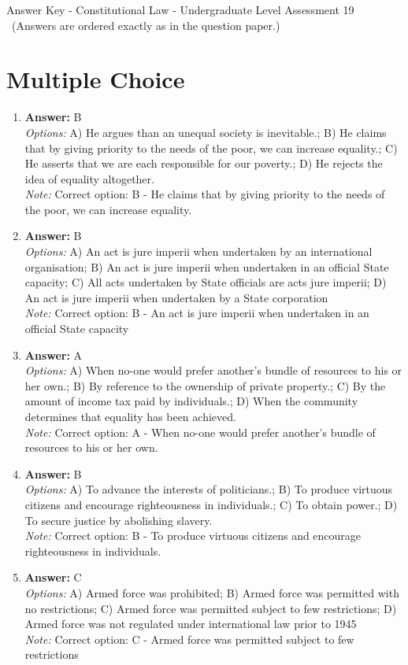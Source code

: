 \documentclass[12pt]{article}
\begin{document}
\begin{center}
Answer Key - Constitutional Law - Undergraduate Level Assessment 19 \
\small (Answers are ordered exactly as in the question paper.)
\end{center}

\section*{Multiple Choice}
\begin{enumerate}[label=\arabic*.]
\item \textbf{Answer:} B
\\ \textit{Options:} A) He argues than an unequal society is inevitable.; B) He claims that by giving priority to the needs of the poor, we can increase equality.; C) He asserts that we are each responsible for our poverty.; D) He rejects the idea of equality altogether.
\\ \textit{Note:} Correct option: B - He claims that by giving priority to the needs of the poor, we can increase equality.
\item \textbf{Answer:} B
\\ \textit{Options:} A) An act is jure imperii when undertaken by an international organisation; B) An act is jure imperii when undertaken in an official State capacity; C) All acts undertaken by State officials are acts jure imperii; D) An act is jure imperii when undertaken by a State corporation
\\ \textit{Note:} Correct option: B - An act is jure imperii when undertaken in an official State capacity
\item \textbf{Answer:} A
\\ \textit{Options:} A) When no-one would prefer another's bundle of resources to his or her own.; B) By reference to the ownership of private property.; C) By the amount of income tax paid by individuals.; D) When the community determines that equality has been achieved.
\\ \textit{Note:} Correct option: A - When no-one would prefer another's bundle of resources to his or her own.
\item \textbf{Answer:} B
\\ \textit{Options:} A) To advance the interests of politicians.; B) To produce virtuous citizens and encourage righteousness in individuals.; C) To obtain power.; D) To secure justice by abolishing slavery.
\\ \textit{Note:} Correct option: B - To produce virtuous citizens and encourage righteousness in individuals.
\item \textbf{Answer:} C
\\ \textit{Options:} A) Armed force was prohibited; B) Armed force was permitted with no restrictions; C) Armed force was permitted subject to few restrictions; D) Armed force was not regulated under international law prior to 1945
\\ \textit{Note:} Correct option: C - Armed force was permitted subject to few restrictions
\end{enumerate}
\end{document}
